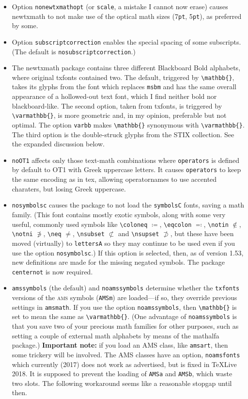 \documentclass[11pt]{article}
\theoremstyle{oldplain}
\theoremstyle{plain}
\begin{document}
\begin{itemize}
\item Option {\tt nonewtxmathopt} (or {\tt scale}, a mistake I cannot now erase) causes newtxmath to not make use of the optical math sizes (7{\tt pt}, 5{\tt pt}), as preferred by some.
\item Option {\tt subscriptcorrection} enables the special spacing of some subscripts. (The default is {\tt nosubscriptcorrection}.)
\item The \textsf{newtxmath} package contains three different Blackboard Bold alphabets, where original \textsf{txfonts} contained two. The default, triggered by \verb|\mathbb{}|, takes its glyphs from the font which replaces {\tt msbm} and has the same overall appearance of a hollowed-out text font, which I find neither bold nor blackboard-like. The second option, taken from \textsf{txfonts}, is triggered by \verb|\varmathbb{}|, is more geometric and, in my opinion, preferable but not optimal. The option {\tt varbb} makes \verb|\mathbb{}| synonymous with \verb|\varmathbb{}|. The third option is the double-struck glyphs from the STIX collection. See the expanded discussion below.
\item {\tt noOT1} affects only those text-math combinations where {\tt operators} is defined by default to OT1 with Greek uppercase letters. It causes {\tt operators} to keep the same encoding as in tex, allowing operatornames to use accented charaters, but losing Greek uppercase.
\item {\tt nosymbolsc} causes the package to not load the {\tt symbolsC} fonts, saving  a math family. (This font contains mostly exotic symbols, along with some very useful, commonly used symbols like \verb|\coloneq| $\coloneq$, \verb|\eqcolon| $\eqcolon$, \verb|\notin| $\notin$, \verb|\notni| $\notni$, \verb|\neq| $\neq$, \verb|\nsubset| $\nsubset$ and \verb|\nsupset| $\nsupset$, but these have been moved (virtually) to {\tt lettersA} so they may continue to be used even if you use the option {\tt nosymbolsc}.) If this option is selected, then, as of version 1.53, new definitions are made for the missing negated symbols. The package {\tt centernot} is now required.
\item {\tt amssymbols} (the default) and {\tt noamssymbols} determine whether the {\tt txfonts} versions of the \textsc{ams} symbols ({\tt AMSm}) are loaded---if so, they override previous settings in {\tt amsmath}. If you use the option {\tt noamssymbols}, then \verb|\mathbb{}| is set to mean the same as \verb|\varmathbb{}|. (One advantage of {\tt noamssymbols} is that you save two of your precious math families for other purposes, such as setting a couple of external math alphabets by means of the \textsf{mathalfa} package.) \textbf{Important note:} if you load an AMS class, like {\tt amsart}, then some trickery will be involved. The AMS classes have an option, {\tt noamsfonts} which currently (2017) does not work as advertised, but is fixed in \TeX Live 2018. It is supposed to prevent the loading of {\tt AMSa} and {\tt AMSb}, which waste two slots. The following workaround seems like a reasonable stopgap until then.

\end{itemize}
\end{document}
